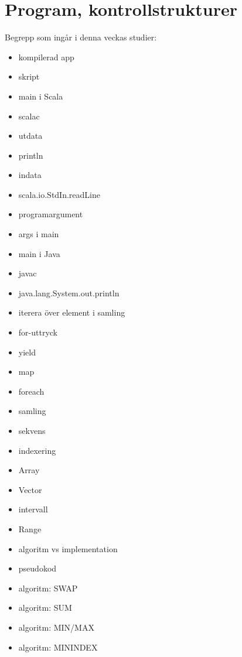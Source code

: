 \chapter{Program, kontrollstrukturer}\label{chapter:W02}
Begrepp som ingår i denna veckas studier:
\begin{multicols}{2}\begin{itemize}[noitemsep,label={$\square$},leftmargin=*]
\item kompilerad app
\item skript
\item main i Scala
\item scalac
\item utdata
\item println
\item indata
\item scala.io.StdIn.readLine
\item programargument
\item args i main
\item main i Java
\item javac
\item java.lang.System.out.println
\item iterera över element i samling
\item for-uttryck
\item yield
\item map
\item foreach
\item samling
\item sekvens
\item indexering
\item Array
\item Vector
\item intervall
\item Range
\item algoritm vs implementation
\item pseudokod
\item algoritm: SWAP
\item algoritm: SUM
\item algoritm: MIN/MAX
\item algoritm: MININDEX\end{itemize}\end{multicols}
